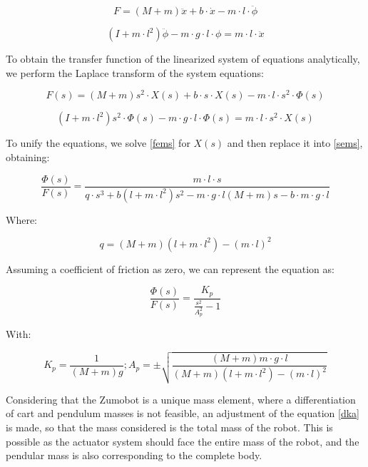 \begin{equation} \label{feml}
	F=(M+m)\ddot{x}+b\cdot \dot{x}-m\cdot l\cdot \ddot{\phi}
\end{equation}

\begin{equation} \label{seml}
	(I+m\cdot l^2)\ddot{\phi}-m\cdot g\cdot l\cdot \phi=m\cdot l\cdot \ddot{x}
\end{equation}

To obtain the transfer function of the linearized system of equations analytically, we perform the Laplace transform of the system equations:

\begin{equation} \label{fems}
	F(s)=(M+m)s^2\cdot X(s)+b\cdot s\cdot X(s)-m\cdot l\cdot s^2\cdot \Phi(s)
\end{equation}

\begin{equation} \label{sems}
	(I+m\cdot l^2)s^2\cdot \Phi(s)-m\cdot g\cdot l\cdot \Phi(s)=m\cdot l\cdot s^2\cdot X(s)
\end{equation}

To unify the equations, we solve \ref{fems} for $X(s)$ and then replace it into \ref{sems}, obtaining:

\begin{equation} \label{ecms}
	\frac{\Phi(s)}{F(s)}=\frac{m\cdot l\cdot s}{q\cdot s^3+b(l+m\cdot l^2)s^2-m\cdot g\cdot l(M+m)s-b\cdot m\cdot g\cdot l}
\end{equation}

Where:

\begin{equation} \label{dq}
	q=(M+m)(l+m\cdot l^2)-(m\cdot l)^2
\end{equation}

Assuming a coefficient of friction as zero, we can represent the equation as:

\begin{equation} \label{efms}
	\frac{\Phi(s)}{F(s)}=\frac{K_p}{\frac{s^2}{A_p^2}-1}
\end{equation}

With:

\begin{equation} \label{dka}
	K_p=\frac{1}{(M+m)g} ; A_p=\pm \sqrt{\frac{(M+m)m\cdot g\cdot l}{(M+m)(l+m\cdot l^2)-(m\cdot l)^2}}
\end{equation}

Considering that the Zumobot is a unique mass element, where a differentiation of cart and pendulum masses is not feasible, an adjustment of the equation \ref{dka} is made, so that the mass considered is the total mass of the robot. This is possible as the actuator system should face the entire mass of the robot, and the pendular mass is also corresponding to the complete body.

